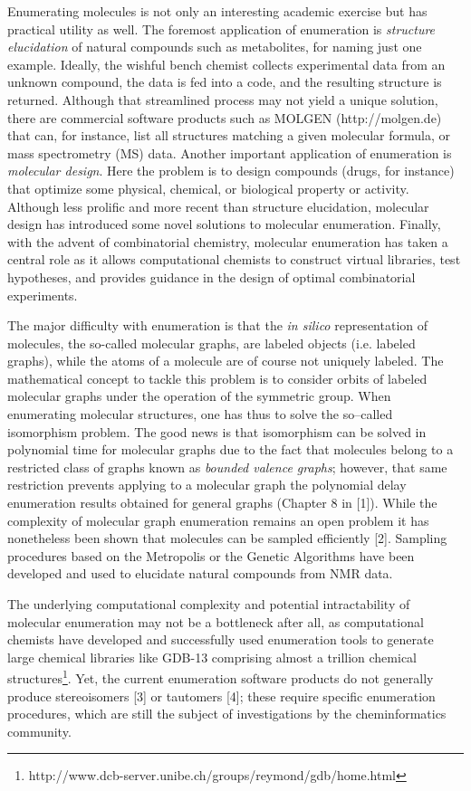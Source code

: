 \documentclass{sig-alternate}
\begin{document}
Enumerating molecules is not only an interesting academic exercise but has
practical utility as well. The foremost application of enumeration is \emph{structure
elucidation} of natural compounds such as metabolites, for naming just one example. 
Ideally, the wishful bench chemist collects experimental data
from an unknown compound, the data is fed into a code, and the resulting
structure is returned. Although that streamlined process may not yield a unique
solution, there are commercial software products such as MOLGEN
(http://molgen.de) that can, for instance, list all structures matching a given
molecular formula, or mass spectrometry (MS) data. Another important application
of enumeration is \emph{molecular design}. Here the problem is to design compounds
(drugs, for instance) that optimize some physical, chemical, or biological
property or activity. Although less prolific and more recent than structure
elucidation, molecular design has introduced some novel solutions to molecular
enumeration. Finally, with the advent of combinatorial chemistry, molecular
enumeration has taken a central role as it allows computational chemists to
construct virtual libraries, test hypotheses, and provides guidance in the
design of optimal combinatorial experiments.

The major difficulty with enumeration is that the \emph{in silico} representation of
molecules, the so-called molecular graphs, are labeled objects (i.e. labeled
graphs), while the atoms of a molecule are of course not uniquely labeled. The
mathematical concept to tackle this problem is to consider orbits of labeled
molecular graphs under the operation of the symmetric group. When enumerating
molecular structures, one has thus to solve the so--called isomorphism problem.
The good news is that isomorphism can be solved in polynomial time for molecular
graphs due to the fact that molecules belong to a restricted class of graphs
known as \emph{bounded valence graphs}; however, that same restriction prevents
applying to a molecular graph the polynomial delay enumeration results obtained
for general graphs (Chapter 8 in [1]). While the complexity of molecular graph
enumeration remains an open problem it has nonetheless been shown that molecules
can be sampled efficiently [2]. Sampling procedures based on the Metropolis or
the Genetic Algorithms have been developed and used to elucidate natural
compounds from NMR data.

The underlying computational complexity and potential intractability
of molecular enumeration may not be a bottleneck after all, as
computational chemists have developed and successfully used
enumeration tools to generate large chemical libraries like GDB-13
comprising almost a trillion chemical
structures\footnote{http://www.dcb-server.unibe.ch/groups/reymond/gdb/home.html}. Yet,
the current enumeration software products do not generally produce
stereoisomers [3] or tautomers [4]; these require specific enumeration
procedures, which are still the subject of investigations by the
cheminformatics community.
\end{document}
